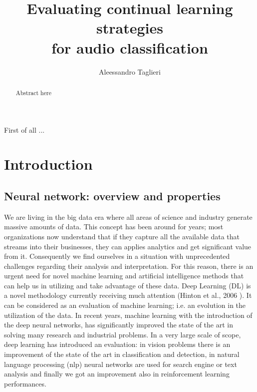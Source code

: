 \documentclass[english, LaM, oneside]{sapthesis}%
\title{Evaluating continual learning strategies \\for audio classification}
\author{Aleessandro Taglieri}
\begin{document}
\frontmatter
\maketitle

\dedication{To...}
\begin{abstract}
Abstract here
\end{abstract}
\begin{acknowledgments}
    First of all ...
\end{acknowledgments}
\tableofcontents

\mainmatter


\chapter{Introduction}
\section{Neural network: overview and properties}
We are living in the big data era where all areas of science and industry generate massive amounts of data. This concept has been around for years; most organizations now understand that if they capture all the available data that streams into their businesses, they can applies analytics and get significant value from it. Consequently we find ourselves in a situation with unprecedented challenges regarding their analysis and interpretation. For this reason, there is an urgent need for novel machine learning and artificial intelligence methods that can help us in utilizing and take advantage of these data. Deep Learning (DL) is a novel methodology currently receiving much attention (Hinton et al., 2006 \cite{Hinton-2006}). It can be considered as an evaluation of machine learning; i.e. an evolution in the utilization of the data.
\newline \newline
In recent years, machine learning with the introduction of the deep neural networks, has significantly improved the state of the art in solving many research and industrial problems. In a very large scale of scope, deep learning has introduced an evaluation: in vision problems there is an improvement of the state of the art in classification and detection, in natural language processing (nlp) neural networks are used for search engine or text analysis and finally we got an improvement also in reinforcement learning performances.
\end{document}
